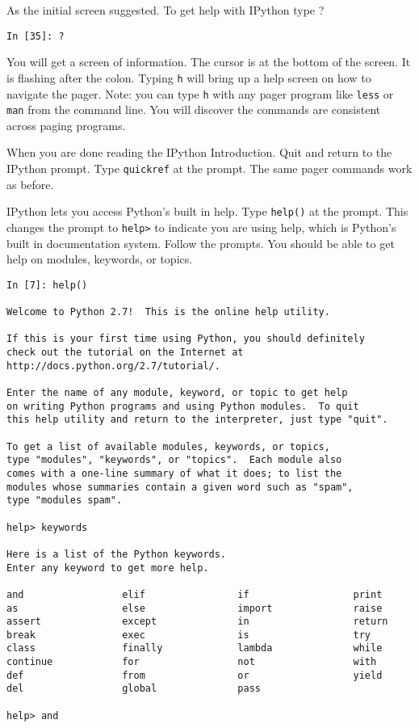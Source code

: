\documentclass[12pt]{article}
\begin{document}
As the initial screen suggested. To get help with IPython type ?

\begin{lstlisting}[style=bash]
In [35]: ?
\end{lstlisting}

You will get a screen of information. The cursor is at the bottom of the screen. It is flashing after the colon. Typing \texttt{h} will bring up a help screen on how to navigate the pager. Note: you can type \texttt{h} with any pager program like \texttt{less} or \texttt{man} from the command line. You will discover the commands are consistent across paging programs.

When you are done reading the IPython Introduction. Quit and return to the IPython prompt. Type \texttt{quickref} at the prompt. The same pager commands work as before. 

IPython lets you access Python's built in help. Type \texttt{help()} at the prompt. This changes the prompt to \texttt{help>} to indicate you are using help, which is Python's built in documentation system. Follow the prompts. You should be able to get help on \textquotesingle modules\textquotesingle, \textquotesingle keywords\textquotesingle, or \textquotesingle topics\textquotesingle .

\begin{lstlisting}[style=bash]
In [7]: help()

Welcome to Python 2.7!  This is the online help utility.

If this is your first time using Python, you should definitely
check out the tutorial on the Internet at
http://docs.python.org/2.7/tutorial/.

Enter the name of any module, keyword, or topic to get help 
on writing Python programs and using Python modules.  To quit 
this help utility and return to the interpreter, just type "quit".

To get a list of available modules, keywords, or topics, 
type "modules", "keywords", or "topics".  Each module also 
comes with a one-line summary of what it does; to list the 
modules whose summaries contain a given word such as "spam", 
type "modules spam".

help> keywords

Here is a list of the Python keywords.  
Enter any keyword to get more help.

and                 elif                if                  print
as                  else                import              raise
assert              except              in                  return
break               exec                is                  try
class               finally             lambda              while
continue            for                 not                 with
def                 from                or                  yield
del                 global              pass                

help> and

\end{lstlisting}
\end{document}
